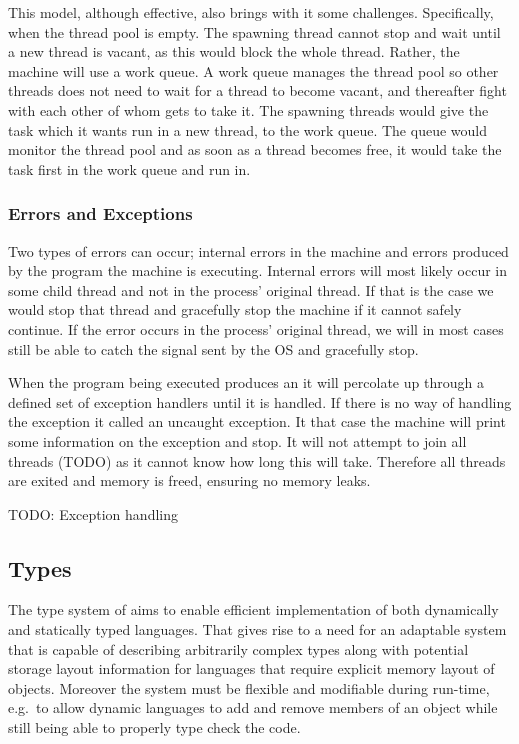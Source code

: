 This model, although effective, also brings with it some
challenges. Specifically, when the thread pool is empty. The spawning thread
cannot stop and wait until a new thread is vacant, as this would block the whole
thread. Rather, the machine will use a work queue. A work queue manages the
thread pool so other threads does not need to wait for a thread to become
vacant, and thereafter fight with each other of whom gets to take it. The
spawning threads would give the task which it wants run in a new thread, to the
work queue. The queue would monitor the thread pool and as soon as a thread
becomes free, it would take the task first in the work queue and run in.

\subsubsection{Errors and Exceptions}
Two types of errors can occur; internal errors in the machine and errors
produced by the program the machine is executing. Internal errors will most
likely occur in some child thread and not in the process' original thread. If
that is the case we would stop that thread and gracefully stop the machine if it
cannot safely continue. If the error occurs in the process' original thread, we
will in most cases still be able to catch the signal sent by the OS and
gracefully stop.

When the program being executed produces an  it will percolate
up through a defined set of exception handlers until it is handled. If there is
no way of handling the exception it called an uncaught exception. It that case
the machine will print some information on the exception and stop. It will not
attempt to join all threads (TODO) as it cannot know how long this will
take. Therefore all threads are exited and memory is freed, ensuring no memory
leaks.

TODO: Exception handling


\subsection{Types}
\label{sec:design:types}

The type system of \thename{} aims to enable efficient implementation of both
dynamically and statically typed languages. That gives rise to a need for an
adaptable system that is capable of describing arbitrarily complex types along
with potential storage layout information for languages that require explicit
memory layout of objects. Moreover the system must be flexible and modifiable
during run-time, e.g.~to allow dynamic languages to add and remove members of an
object while still being able to properly type check the code.

